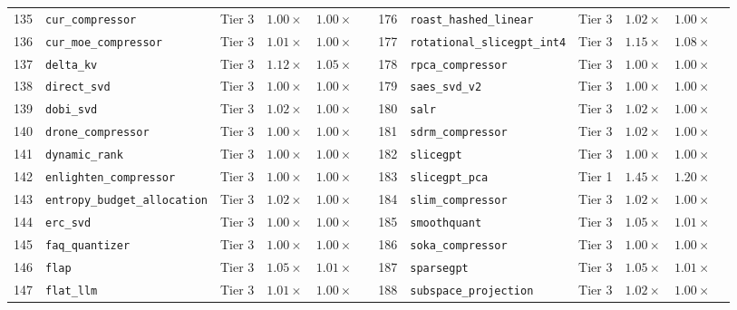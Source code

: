 \begin{table}[t]
{\begin{tabular}{r l c c c l | r l c c c l}
135 & \texttt{cur\_compressor} & Tier 3 & $1.00\times$ & $1.00\times$ & \passslow{} & 176 & \texttt{roast\_hashed\_linear} & Tier 3 & $1.02\times$ & $1.00\times$ & \passslow{} \\
136 & \texttt{cur\_moe\_compressor} & Tier 3 & $1.01\times$ & $1.00\times$ & \passslow{} & 177 & \texttt{rotational\_slicegpt\_int4} & Tier 3 & $1.15\times$ & $1.08\times$ & \passfast{} \\
137 & \texttt{delta\_kv} & Tier 3 & $1.12\times$ & $1.05\times$ & \passfast{} & 178 & \texttt{rpca\_compressor} & Tier 3 & $1.00\times$ & $1.00\times$ & \passslow{} \\
138 & \texttt{direct\_svd} & Tier 3 & $1.00\times$ & $1.00\times$ & \passslow{} & 179 & \texttt{saes\_svd\_v2} & Tier 3 & $1.00\times$ & $1.00\times$ & \passslow{} \\
139 & \texttt{dobi\_svd} & Tier 3 & $1.02\times$ & $1.00\times$ & \passslow{} & 180 & \texttt{salr} & Tier 3 & $1.02\times$ & $1.00\times$ & \passslow{} \\
140 & \texttt{drone\_compressor} & Tier 3 & $1.00\times$ & $1.00\times$ & \passslow{} & 181 & \texttt{sdrm\_compressor} & Tier 3 & $1.02\times$ & $1.00\times$ & \passslow{} \\
141 & \texttt{dynamic\_rank} & Tier 3 & $1.00\times$ & $1.00\times$ & \passslow{} & 182 & \texttt{slicegpt} & Tier 3 & $1.00\times$ & $1.00\times$ & \passslow{} \\
142 & \texttt{enlighten\_compressor} & Tier 3 & $1.00\times$ & $1.00\times$ & \passslow{} & 183 & \texttt{slicegpt\_pca} & Tier 1 & $1.45\times$ & $1.20\times$ & \passfast{} \\
143 & \texttt{entropy\_budget\_allocation} & Tier 3 & $1.02\times$ & $1.00\times$ & \passslow{} & 184 & \texttt{slim\_compressor} & Tier 3 & $1.02\times$ & $1.00\times$ & \passslow{} \\
144 & \texttt{erc\_svd} & Tier 3 & $1.00\times$ & $1.00\times$ & \passslow{} & 185 & \texttt{smoothquant} & Tier 3 & $1.05\times$ & $1.01\times$ & \passfast{} \\
145 & \texttt{faq\_quantizer} & Tier 3 & $1.00\times$ & $1.00\times$ & \passslow{} & 186 & \texttt{soka\_compressor} & Tier 3 & $1.00\times$ & $1.00\times$ & \passslow{} \\
146 & \texttt{flap} & Tier 3 & $1.05\times$ & $1.01\times$ & \passfast{} & 187 & \texttt{sparsegpt} & Tier 3 & $1.05\times$ & $1.01\times$ & \passfast{} \\
147 & \texttt{flat\_llm} & Tier 3 & $1.01\times$ & $1.00\times$ & \passslow{} & 188 & \texttt{subspace\_projection} & Tier 3 & $1.02\times$ & $1.00\times$ & \passslow{} \\

\end{tabular}}
\end{table}

